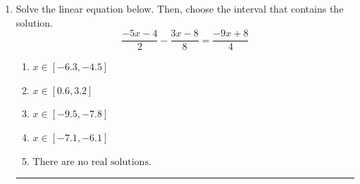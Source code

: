 \documentclass[14pt]{extbook}
\newcommand{\litem}[1]{\item#1\hspace*{-1cm}\rule{\textwidth}{0.4pt}}
\begin{document}
\begin{enumerate}
{\begin{enumerate}[label=\Alph*.]
\end{enumerate} }
\litem{
Solve the linear equation below. Then, choose the interval that contains the solution.\[ \frac{-5x -4}{2} - \frac{3x -8}{8} = \frac{-9x + 8}{4} \]\begin{enumerate}[label=\Alph*.]
\item \( x \in [-6.3, -4.5] \)
\item \( x \in [0.6, 3.2] \)
\item \( x \in [-9.5, -7.8] \)
\item \( x \in [-7.1, -6.1] \)
\item \( \text{There are no real solutions.} \)

\end{enumerate} }
\end{enumerate}
\end{document}
